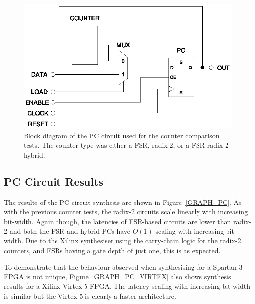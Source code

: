 \documentclass[5p, twocolumn]{elsarticle}
\begin{document}
\begin{figure}[ht!]
\begin{center}
\includegraphics[width=\linewidth]{diagrams/pc_circuit.eps}
\caption[Counter performance vs. counter size]{Block diagram of the PC
circuit used for the counter comparison tests. The counter type was either a
FSR, radix-2, or a FSR-radix-2 hybrid.}
\label{PC_CIRCUIT}
\end{center}
\end{figure}


\subsection{PC Circuit Results}

The results of the PC circuit synthesis are shown in Figure~\ref{GRAPH_PC}. As
with the previous counter tests, the radix-2 circuits scale linearly with
increasing bit-width. Again though, the latencies of FSR-based circuits are lower
than radix-2 and both the FSR and hybrid PCs have $O(1)$ scaling with increasing
bit-width. Due to the Xilinx synthesiser using the carry-chain logic for the
radix-2 counters, and FSRs having a gate depth of just one, this is as expected.

To demonstrate that the behaviour observed when synthesising for a Spartan-3 FPGA
is not unique, Figure~\ref{GRAPH_PC_VIRTEX} also shows synthesis results for a
Xilinx Virtex-5 FPGA. The latency scaling with increasing bit-width is similar
but the Virtex-5 is clearly a faster architecture.
\end{document}
